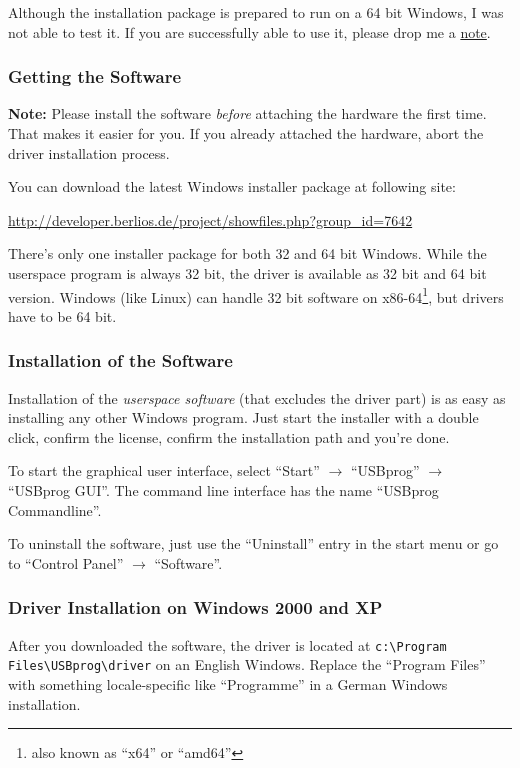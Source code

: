 \documentclass[bibtotoc,UKenglish,halfparskip,oneside,DIV12]{scrreprt}
\begin{document}
Although the installation package is prepared to run on a 64 bit Windows, I was not able to test it.
If you are successfully able to use it, please drop me a \href{bernhard@bwalle.de}{note}.

\subsubsection{Getting the Software}

\textbf{Note:} Please install the software \emph{before} attaching the hardware the first time. That
makes it easier for you. If you already attached the hardware, abort the driver installation
process.

You can download the latest Windows installer package at following site:

 \url{http://developer.berlios.de/project/showfiles.php?group_id=7642}

There's only one installer package for both 32 and 64 bit Windows. While the userspace program is
always 32 bit, the driver is available as 32 bit and 64 bit version. Windows (like Linux) can handle
32 bit software on x86-64\footnote{also known as ``x64'' or ``amd64''}, but drivers have to be 64
bit.


\subsubsection{Installation of the Software}

Installation of the \emph{userspace software} (that excludes the driver part) is as easy as
installing any other Windows program. Just start the installer with a double click, confirm the
license, confirm the installation path and you're done.

To start the graphical user interface, select ``Start'' $\rightarrow$ ``USBprog''
$\rightarrow$ ``USBprog GUI''. The command line interface has the name ``USBprog Commandline''.

To uninstall the software, just use the ``Uninstall'' entry in the start menu or go to ``Control
Panel'' $\rightarrow$ ``Software''.


\subsubsection{Driver Installation on Windows 2000 and XP}

After you downloaded the software, the driver is located at \texttt{c:\textbackslash{}Program
Files\textbackslash{}USBprog\textbackslash{}driver} on an English Windows. Replace the ``Program
Files'' with something locale-specific like ``Programme'' in a German Windows installation.
\end{document}
